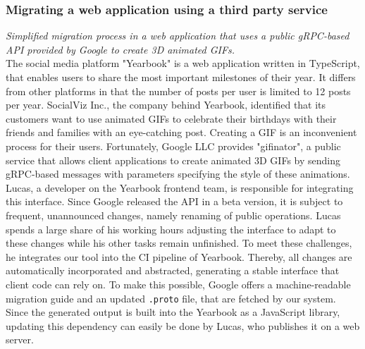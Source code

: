 \subsubsection{Migrating a web application using a third party service}
\label{subsubsec:Scenario:gRPCScenario}

\textit{Simplified migration process in a web application that uses a public gRPC-based API provided by Google to create 3D animated GIFs.}
\medskip
\\ The social media platform "Yearbook" is a web application written in TypeScript, that enables users to share the most important milestones of their year. It differs from other platforms in that the number of posts per user is limited to 12 posts per year. SocialViz Inc., the company behind Yearbook, identified that its customers want to use animated GIFs to celebrate their birthdays with their friends and families with an eye-catching post. Creating a GIF is an inconvenient process for their users. Fortunately, Google LLC provides "gifinator", a public service that allows client applications to create animated 3D GIFs by sending gRPC-based messages with parameters specifying the style of these animations. Lucas, a developer on the Yearbook frontend team, is responsible for integrating this interface. Since Google released the API in a beta version, it is subject to frequent, unannounced changes, namely renaming of public operations. Lucas spends a large share of his working hours adjusting the interface to adapt to these changes while his other tasks remain unfinished. To meet these challenges, he integrates our tool into the CI pipeline of Yearbook. Thereby, all changes are automatically incorporated and abstracted, generating a stable interface that client code can rely on. To make this possible, Google offers a machine-readable migration guide and an updated \texttt{.proto} file, that are fetched by our system. Since the generated output is built into the Yearbook as a JavaScript library, updating this dependency can easily be done by Lucas, who publishes it on a web server.